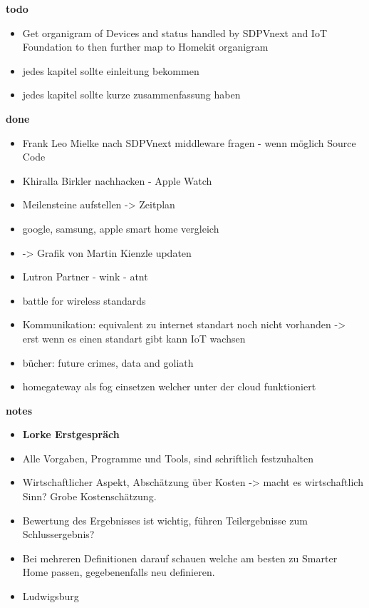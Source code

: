 \textbf{todo}
	\begin{itemize}
		
		\item Get organigram of Devices and status handled by SDPVnext and IoT Foundation to then further map to Homekit organigram

		\item jedes kapitel sollte einleitung bekommen

		\item jedes kapitel sollte kurze zusammenfassung haben
		
	\end{itemize}

\textbf{done}
	\begin{itemize}
		\item Frank Leo Mielke nach SDPVnext middleware fragen - wenn möglich Source Code
		\item Khiralla Birkler nachhacken - Apple Watch
		\item Meilensteine aufstellen -> Zeitplan
		\item google, samsung, apple smart home vergleich
		\item -> Grafik von Martin Kienzle updaten
		\item Lutron Partner - wink - atnt
		\item battle for wireless standards
		\item Kommunikation: equivalent zu internet standart noch nicht vorhanden -> erst wenn es einen standart gibt kann IoT wachsen
		\item bücher: future crimes, data and goliath
		\item homegateway als fog einsetzen welcher unter der cloud funktioniert

	\end{itemize}

\textbf{notes}
	\begin{itemize}
		\item \textbf{Lorke Erstgespräch}
		\item Alle Vorgaben, Programme und Tools, sind schriftlich festzuhalten
		\item Wirtschaftlicher Aspekt, Abschätzung über Kosten -> macht es wirtschaftlich Sinn? Grobe Kostenschätzung.
		\item Bewertung des Ergebnisses ist wichtig, führen Teilergebnisse zum Schlussergebnis?
		\item Bei mehreren Definitionen darauf schauen welche am besten zu Smarter Home passen, gegebenenfalls neu definieren.
		\item Ludwigsburg
	\end{itemize}

